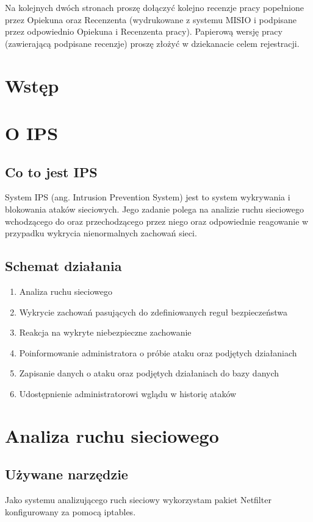 \documentclass[a4paper,12pt]{book}
\begin{document}
\newpage
\linespread{1.3}
\selectfont

\noindent
Na kolejnych dwóch stronach proszę dołączyć kolejno recenzje pracy popełnione przez Opiekuna oraz Recenzenta (wydrukowane z systemu MISIO i podpisane przez odpowiednio Opiekuna i Recenzenta pracy). Papierową wersję pracy (zawierającą podpisane recenzje) proszę złożyć w dziekanacie celem rejestracji.

\vspace{85mm}
\tableofcontents
\chapter*{Wstęp}
\chapter{O IPS}
	\section{Co to jest IPS}
	System IPS (ang. Intrusion Prevention System) jest to system wykrywania i blokowania ataków sieciowych.
	Jego zadanie polega na analizie ruchu sieciowego wchodzącego do oraz przechodzącego przez niego oraz odpowiednie reagowanie w przypadku wykrycia nienormalnych zachowań sieci.
	\section{Schemat działania}
		\begin{enumerate}
			\item Analiza ruchu sieciowego
			\item Wykrycie zachowań pasujących do zdefiniowanych reguł bezpieczeństwa
			\item Reakcja na wykryte niebezpieczne zachowanie
			\item Poinformowanie administratora o próbie ataku oraz podjętych działaniach
			\item Zapisanie danych o ataku oraz podjętych działaniach do bazy danych
			\item Udostępnienie administratorowi wglądu w historię ataków
		\end{enumerate}
\chapter{Analiza ruchu sieciowego}
	\section{Używane narzędzie}
		Jako systemu analizującego ruch sieciowy wykorzystam pakiet Netfilter konfigurowany za pomocą iptables.
\end{document}
